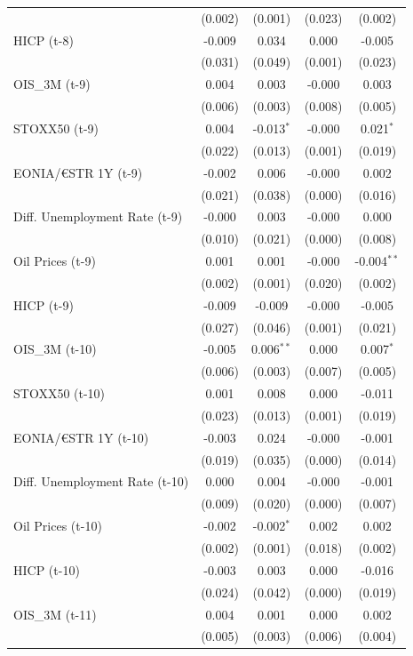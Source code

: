 \begin{longtable}[t]{lcccc}
 & (0.002) & (0.001) & (0.023) & (0.002)\\
HICP (t-8) & -0.009 & 0.034 & 0.000 & -0.005\\
 & (0.031) & (0.049) & (0.001) & (0.023)\\
OIS\_3M (t-9) & 0.004 & 0.003 & -0.000 & 0.003\\
 & (0.006) & (0.003) & (0.008) & (0.005)\\
STOXX50 (t-9) & 0.004 & -0.013$^{*}$ & -0.000 & 0.021$^{*}$\\
 & (0.022) & (0.013) & (0.001) & (0.019)\\
EONIA/€STR 1Y (t-9) & -0.002 & 0.006 & -0.000 & 0.002\\
 & (0.021) & (0.038) & (0.000) & (0.016)\\
Diff. Unemployment Rate (t-9) & -0.000 & 0.003 & -0.000 & 0.000\\
 & (0.010) & (0.021) & (0.000) & (0.008)\\
Oil Prices (t-9) & 0.001 & 0.001 & -0.000 & -0.004$^{**}$\\
 & (0.002) & (0.001) & (0.020) & (0.002)\\
HICP (t-9) & -0.009 & -0.009 & -0.000 & -0.005\\
 & (0.027) & (0.046) & (0.001) & (0.021)\\
OIS\_3M (t-10) & -0.005 & 0.006$^{**}$ & 0.000 & 0.007$^{*}$\\
 & (0.006) & (0.003) & (0.007) & (0.005)\\
STOXX50 (t-10) & 0.001 & 0.008 & 0.000 & -0.011\\
 & (0.023) & (0.013) & (0.001) & (0.019)\\
EONIA/€STR 1Y (t-10) & -0.003 & 0.024 & -0.000 & -0.001\\
 & (0.019) & (0.035) & (0.000) & (0.014)\\
Diff. Unemployment Rate (t-10) & 0.000 & 0.004 & -0.000 & -0.001\\
 & (0.009) & (0.020) & (0.000) & (0.007)\\
Oil Prices (t-10) & -0.002 & -0.002$^{*}$ & 0.002 & 0.002\\
 & (0.002) & (0.001) & (0.018) & (0.002)\\
HICP (t-10) & -0.003 & 0.003 & 0.000 & -0.016\\
 & (0.024) & (0.042) & (0.000) & (0.019)\\
OIS\_3M (t-11) & 0.004 & 0.001 & 0.000 & 0.002\\
 & (0.005) & (0.003) & (0.006) & \vphantom{1} (0.004)\\

\end{longtable}

